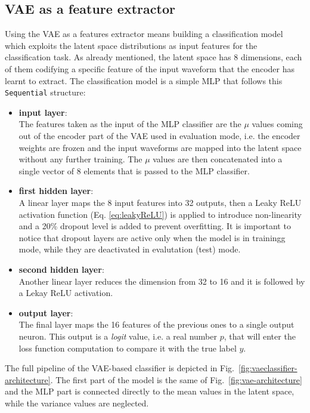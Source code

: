 \subsection{\texorpdfstring{\acs{VAE}}{VAE} as a feature extractor}
\label{subsec:VAE-features_extraction}
Using the \ac{VAE} as a features extractor means building a classification model which exploits the latent space distributions as input features for the classification task. As already mentioned, the latent space has 8 dimensions, each of them codifying a specific feature of the input waveform that the encoder has learnt to extract. 
The classification model is a simple \ac{MLP} that follows this \texttt{Sequential} structure:
\begin{itemize}
    \item \textbf{input layer}:\\
    The features taken as the input of the \ac{MLP} classifier are the $\mu$ values coming out of the encoder part of the \ac{VAE} used in evaluation mode, i.e. the encoder weights are frozen and the input waveforms are mapped into the latent space without any further training. The $\mu$ values are then concatenated into a single vector of 8 elements that is passed to the \ac{MLP} classifier.
    \item \textbf{first hidden layer}:\\
    A linear layer maps the 8 input features into 32 outputs, then a Leaky ReLU activation function (Eq. \ref{eq:leakyReLU}) is applied to introduce non-linearity and a 20\% dropout level is added to prevent overfitting. It is important to notice that dropout layers are active only when the model is in trainingg mode, while they are deactivated in evalutation (test) mode.
    \item \textbf{second hidden layer}:\\
    Another linear layer reduces the dimension from 32 to 16 and it is followed by a Lekay ReLU activation.
    \item \textbf{output layer}:\\
    The final layer maps the 16 features of the previous ones to a single output neuron. This output is a \textit{logit} value, i.e. a real number $p$, that will enter the loss function computation to compare it with the true label $y$.
\end{itemize}

The full pipeline of the \ac{VAE}-based classifier is depicted in Fig.~\ref{fig:vaeclassifier-architecture}. The first part of the model is the same of Fig.~\ref{fig:vae-architecture} and the \ac{MLP} part is connected directly to the mean values in the latent space, while the variance values are neglected. 

